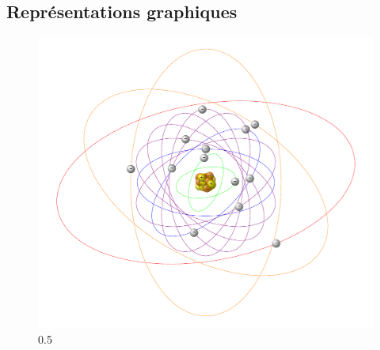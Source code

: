 \subsection{Représentations graphiques}

\begin{center}
\begin{figure}[h] %
\startcstep %
	\begin{minipage}{.69\linewidth}
		\begin{annotate}
			{\includegraphics[scale=.6]{fig_aluminium_modelisation.pdf}}{0.5} %


\end{annotate}
\end{minipage}
\end{figure}
\end{center}
